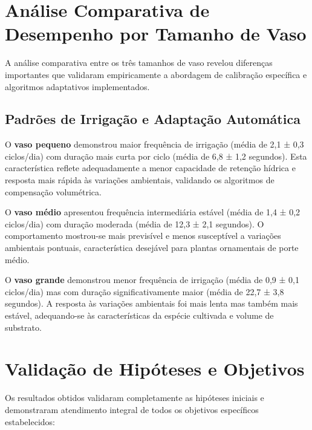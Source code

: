 \documentclass[twoside,english,brazilian]{UNISINOSmonografia}
\begin{document}
\section{Análise Comparativa de Desempenho por Tamanho de Vaso}

A análise comparativa entre os três tamanhos de vaso revelou diferenças importantes que validaram empiricamente a abordagem de calibração específica e algoritmos adaptativos implementados.

\subsection{Padrões de Irrigação e Adaptação Automática}

O \textbf{vaso pequeno} demonstrou maior frequência de irrigação (média de 2,1 ± 0,3 ciclos/dia) com duração mais curta por ciclo (média de 6,8 ± 1,2 segundos). Esta característica reflete adequadamente a menor capacidade de retenção hídrica e resposta mais rápida às variações ambientais, validando os algoritmos de compensação volumétrica.

O \textbf{vaso médio} apresentou frequência intermediária estável (média de 1,4 ± 0,2 ciclos/dia) com duração moderada (média de 12,3 ± 2,1 segundos). O comportamento mostrou-se mais previsível e menos susceptível a variações ambientais pontuais, característica desejável para plantas ornamentais de porte médio.

O \textbf{vaso grande} demonstrou menor frequência de irrigação (média de 0,9 ± 0,1 ciclos/dia) mas com duração significativamente maior (média de 22,7 ± 3,8 segundos). A resposta às variações ambientais foi mais lenta mas também mais estável, adequando-se às características da espécie cultivada e volume de substrato.


\section{Validação de Hipóteses e Objetivos}

Os resultados obtidos validaram completamente as hipóteses iniciais e demonstraram atendimento integral de todos os objetivos específicos estabelecidos:
\end{document}
